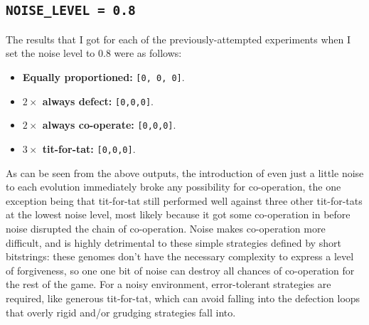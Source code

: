 \documentclass[a4paper]{article}
\begin{document}
\subsection{\texttt{NOISE_LEVEL = 0.8}}
The results that I got for each of the previously-attempted experiments when I set the noise level to 0.8 were as follows:
\begin{itemize}
    \item   \textbf{Equally proportioned:} \verb|[0, 0, 0]|.
    \item   \textbf{$2 \times$ always defect:} \verb|[0,0,0]|.
    \item   \textbf{$2 \times$ always co-operate:} \verb|[0,0,0]|.
    \item   \textbf{$3 \times$ tit-for-tat:} \verb|[0,0,0]|.
\end{itemize}

As can be seen from the above outputs, the introduction of even just a little noise to each evolution immediately broke any possibility for co-operation, the one exception being that tit-for-tat still performed well against three other tit-for-tats at the lowest noise level, most likely because it got some co-operation in before noise disrupted the chain of co-operation.
Noise makes co-operation more difficult, and is highly detrimental to these simple strategies defined by short bitstrings: 
these genomes don't have the necessary complexity to express a level of forgiveness, so one one bit of noise can destroy all chances of co-operation for the rest of the game.
For a noisy environment, error-tolerant strategies are required, like generous tit-for-tat, which can avoid falling into the defection loops that overly rigid and/or grudging strategies fall into.
\end{document}

